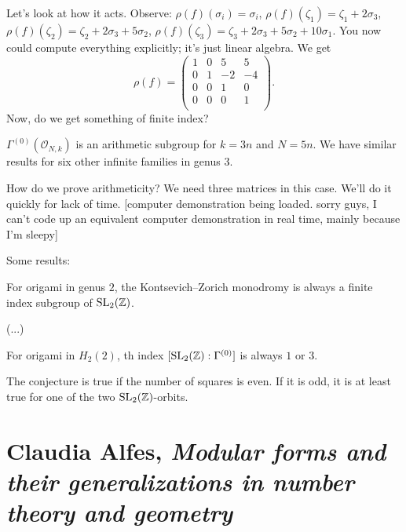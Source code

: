 \documentclass[reqno]{amsart} 
\numberwithin{theorem}{section}
\numberwithin{equation}{section}
\begin{document}
Let's look at how it acts.  Observe: $\rho(f)(\sigma_i) = \sigma_i$, $\rho(f)(\zeta_1) = \zeta_1 + 2 \sigma_3$, $\rho(f)(\zeta_2) = \zeta_2 + 2 \sigma_3 + 5 \sigma_2$, $\rho(f)(\zeta_3) = \zeta_3 + 2 \sigma_3 + 5 \sigma_2 + 10 \sigma_1$.  You now could compute everything explicitly; it's just linear algebra.  We get
\begin{equation*}
  \rho(f) =
  \begin{pmatrix}
    1    & 0 & 5 & 5 \\
    0 & 1 & -2 & -4 \\
    0 & 0 & 1 & 0 \\
    0 & 0 & 0 & 1 \\
  \end{pmatrix}.
\end{equation*}
Now, do we get something of finite index?
\begin{theorem}[BKKMNSV]
  $\Gamma^{(0)}(\mathcal{O}_{N, k})$ is an arithmetic subgroup for $k = 3 n$ and $N = 5 n$.  We have similar results for six other infinite families in genus $3$.
\end{theorem}

How do we prove arithmeticity?  We need three matrices in this case.  We'll do it quickly for lack of time.  [computer demonstration being loaded.  sorry guys, I can't code up an equivalent computer demonstration in real time, mainly because I'm sleepy]

Some results:
\begin{theorem}
  For origami in genus  $2$, the Kontsevich--Zorich monodromy is always a finite index subgroup of $\operatorname{SL}_2(\mathbb{Z})$.
\end{theorem}
(...)
\begin{conjecture}[BKKMNSVW]
  For origami in $H_2(2)$, th index $[\operatorname{SL}_2(\mathbb{Z}) : \Gamma^{(0)}]$ is always $1$ or $3$.
\end{conjecture}

\begin{theorem}[Kattler]
  The conjecture is true if the number of squares is even.  If it is odd, it is at least true for one of the two $\operatorname{SL}_2(\mathbb{Z})$-orbits.  
\end{theorem}

\section{Claudia Alfes, \emph{Modular forms and their generalizations in number theory and geometry}}
\end{document}
